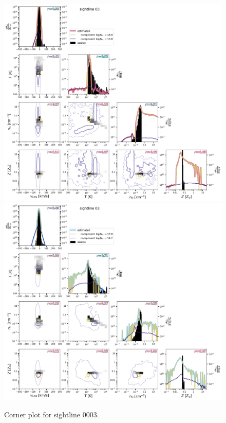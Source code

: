 \documentclass[fleqn,usenatbib]{mnras}
\begin{document}
\begin{figure}
    \centering
    \includegraphics[height=0.45\textheight]{figures/sample2/original/sightline_0003.png}
    \includegraphics[height=0.45\textheight]{figures/sample2/high-z/sightline_0003.png}
    \caption{Corner plot for sightline 0003.}
    \label{f: sample2 03 corner}
\end{figure}
\end{document}
